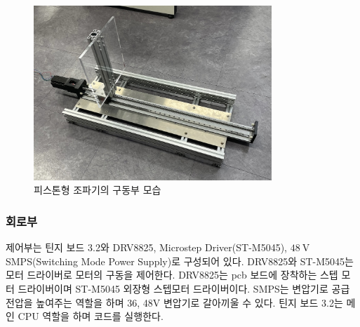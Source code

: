 \begin{figure}[H]
    \centering
        \includegraphics[width=0.8\textwidth]{images/jopagi.jpg} 
    \caption{피스톤형 조파기의 구동부 모습}
    \label{wavemaker-photo}
\end{figure}


\subsubsection{회로부}

제어부는 틴지 보드 3.2와 DRV8825, Microstep Driver(ST-M5045), $48\mathrm{~V}$ SMPS(Switching Mode Power Supply)로 구성되어 있다. DRV8825와 ST-M5045는 모터 드라이버로 모터의 구동을 제어한다. DRV8825는 pcb 보드에 장착하는 스텝 모터 드라이버이며 ST-M5045 외장형 스텝모터 드라이버이다. SMPS는 변압기로 공급 전압을 높여주는 역할을 하며 36, 48V 변압기로 갈아끼울 수 있다. 틴지 보드 3.2는 메인 CPU 역할을 하며 코드를 실행한다.


